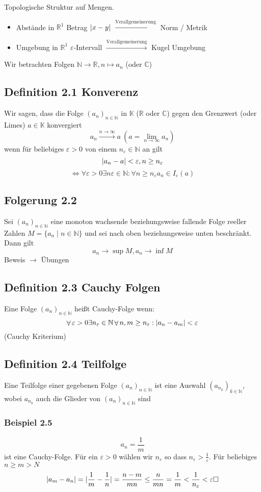 \documentclass[a4paper]{scrartcl}
\DeclarePairedDelimiter\abs{\lvert}{\rvert}%
\DeclareMathOperator{\Forall}{\forall}%
\begin{document}
Topologische Struktur auf Mengen.
\begin{itemize}
\item Abstände in $\mathbb{R}^1$ Betrag $\abs{x - y}$ $\xrightarrow{\text{Verallgemeinerung}}$ Norm / Metrik
\item Umgebung in $\mathbb{R}^1$ $\varepsilon$-Intervall $\xrightarrow{\text{Verallgemeinerung}}$ Kugel Umgebung
\end{itemize}

Wir betrachten Folgen $\mathbb{N}\to\mathbb{R}, n\mapsto a_n$ (oder $\mathbb{C}$)
\subsection{Definition 2.1 Konverenz}
\label{sec-4-1}
Wir sagen, dass die Folge $(a_n)_{n\in\mathbb{N}}$ in $\mathbb{K}$ ($\mathbb{R}$ oder $\mathbb{C}$) gegen den Grenzwert (oder Limes) $a\in\mathbb{K}$ konvergiert
\[a_n \xrightarrow{n\to\infty} a~(a=\lim_{n\to\infty} a_n)\]
wenn für beliebiges $\varepsilon > 0$ von einem $n_\varepsilon \in\mathbb{N}$ an gilt
\[\abs{a_n - a} < \varepsilon,n\geq n_\varepsilon\]
\[\Leftrightarrow \Forall\varepsilon > 0\exists n\varepsilon \in\mathbb{N}:\Forall n\geq n_\varepsilon a_n \in I_\varepsilon(a)\]
\subsection{Folgerung 2.2}
\label{sec-4-2}
Sei $(a_n)_{n\in\mathbb{N}}$ eine monoton wachsende beziehungsweise fallende Folge reeller Zahlen $M=\{a_n\mid n\in\mathbb{N}\}$ und sei nach oben beziehungsweise unten beschränkt. Dann gilt \[a_n\to\sup M, a_n\to\inf M\]
Beweis $\to$ Übungen
\subsection{Definition 2.3 Cauchy Folgen}
\label{sec-4-3}
Eine Folge $(a_n)_{n\in\mathbb{N}}$ heißt Cauchy-Folge wenn:
\[\Forall\varepsilon > 0\exists n_\varepsilon \in\mathbb{N}\Forall n,m \geq n_\varepsilon: \abs{a_n - a_m} < \varepsilon \]
(Cauchy Kriterium)
\subsection{Definition 2.4 Teilfolge}
\label{sec-4-4}
Eine Teilfolge einer gegebenen Folge $(a_n)_{n\in\mathbb{N}}$ ist eine Auswahl $(a_{n_k})_{k\in\mathbb{N}}$, wobei $a_{n_k}$ auch die Glieder von $(a_n)_{n\in\mathbb{N}}$ sind
\subsubsection{Beispiel 2.5}
\label{sec-4-4-1}
\[a_n = \frac{1}{m}\] ist eine Cauchy-Folge. Für ein $\varepsilon > 0$ wählen wir $n_\varepsilon$ so dass $n_\varepsilon > \frac{1}{\varepsilon}$. Für beliebiges $n\geq m > N$
\[\abs{a_m - a_n} = \abs{\frac{1}{m} - \frac{1}{n}} = \frac{n - m}{m n} \leq \frac{n}{m n} = \frac{1}{m} < \frac{1}{n_\varepsilon} < \varepsilon\hfill\square\]
\end{document}
